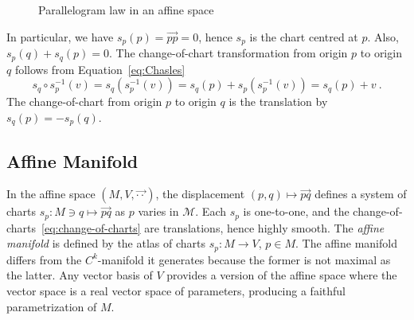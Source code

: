 \documentclass[axioms,article,submit,pdftex,moreauthors]{Definitions/mdpi}
\theoremstyle{plain}
\theoremstyle{remark}
\begin{document}
\begin{figure}[t]
\caption{Parallelogram law in an affine space}
    \label{fig:aff_1}
\end{figure}
   
In particular, we have $s_p(p) = \overrightarrow{pp} = 0$, hence $s_p$ is the chart centred at $p$. Also, $s_p(q) + s_q(p) = 0$. The change-of-chart transformation from origin $p$ to origin $q$ follows from Equation~\eqref{eq:Chasles}
\begin{equation} \label{eq:change-of-charts}
  s_q \circ s^{-1}_p (v) =s_q(s^{-1}_p (v)) = s_q(p) + s_p(s^{-1}_p (v)) = s_q(p) + v \ .
\end{equation}
The change-of-chart from origin $p$ to origin $q$ is the translation by $s_q(p) = - s_p(q)$.

\subsection{Affine Manifold}
In the affine space \( (M, V, \overrightarrow{\cdot \cdot}) \), the displacement \( (p,q) \mapsto \overrightarrow{pq} \) defines a system of charts $s_p \colon M \ni q \mapsto \overrightarrow{pq}$ as $p$ varies in $\mathcal{M}$. 
Each $s_p$ is one-to-one, and the change-of-charts~\eqref{eq:change-of-charts} are translations, hence highly smooth. The \emph{affine manifold}  is defined by the atlas of charts \( s_p : M \to V \), \( p \in M \). The affine manifold differs from the $C^k$-manifold it generates because the former is not maximal as the latter. Any vector basis of \(V\) provides a version of the affine space where the vector space is a real vector space of parameters, producing a faithful parametrization of \(M\).
\end{document}
